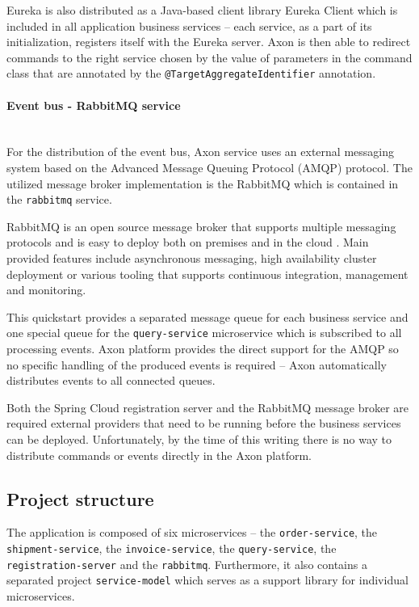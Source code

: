 \documentclass[oneside,
  digital, %
  table,   %
  lof,     %
  lot,     %
]{fithesis3}
\newcommand{\newlinepar}[1]{\paragraph{#1}\needspace{4\baselineskip}\mbox{}\\}
\begin{document}

Eureka is also distributed as a Java-based client library Eureka Client which is included in all application business services -- each service, as a part of its initialization, registers itself with the Eureka server. Axon is then able to redirect commands to the right service chosen by the value of parameters in the command class that are annotated by the \texttt{@TargetAggregateIdentifier} annotation.

\newlinepar{Event bus - RabbitMQ service}

For the distribution of the event bus, Axon service uses an external messaging system based on the Advanced Message Queuing Protocol (AMQP) protocol. The utilized message broker implementation is the RabbitMQ \cite{rabbitmq} which is contained in the \texttt{rabbitmq} service. 

RabbitMQ is an open source message broker that supports multiple messaging protocols and is easy to deploy both on premises and in the cloud \cite{rabbitmq}. Main provided features include asynchronous messaging, high availability cluster deployment or various tooling that supports continuous integration, management and monitoring.

This quickstart provides a separated message queue for each business service and one special queue for the \texttt{query-service} microservice which is subscribed to all processing events. Axon platform provides the direct support for the AMQP so no specific handling of the produced events is required -- Axon automatically distributes events to all connected queues.

Both the Spring Cloud registration server and the RabbitMQ message broker are required external providers that need to be running before the business services can be deployed. Unfortunately, by the time of this writing there is no way to distribute commands or events directly in the Axon platform.

\subsection{Project structure}

The application is composed of six microservices -- the  \texttt{order-service}, the \texttt{shipment-service}, the \texttt{invoice-service}, the \texttt{query-service}, the \texttt{registration-server} and the \texttt{rabbitmq}. Furthermore, it also contains a separated project \texttt{service-model} which serves as a support library for individual microservices.
\end{document}
